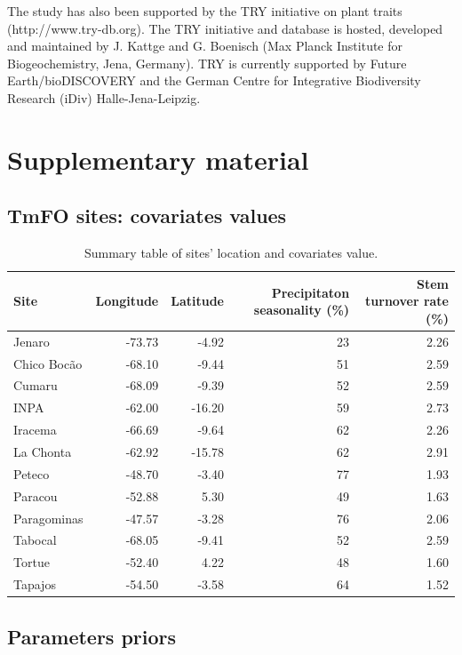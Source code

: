 \documentclass[]{elsarticle} %
\begin{document}
The study has also been supported by the TRY initiative on plant traits
(http://www.try-db.org). The TRY initiative and database is hosted,
developed and maintained by J. Kattge and G. Boenisch (Max Planck
Institute for Biogeochemistry, Jena, Germany). TRY is currently
supported by Future Earth/bioDISCOVERY and the German Centre for
Integrative Biodiversity Research (iDiv) Halle-Jena-Leipzig.

\section{Supplementary material}\label{supplementary-material}

\subsection{TmFO sites: covariates
values}\label{tmfo-sites-covariates-values}

\begin{table}

\caption{\label{tab:unnamed-chunk-3}\label{tab:sites}Summary table of sites' location and covariates value.}
\centering
\begin{tabular}[t]{lrrrr}
\toprule
Site & Longitude & Latitude & Precipitaton seasonality (\%) & Stem turnover rate (\%)\\
\midrule
Jenaro & -73.73 & -4.92 & 23 & 2.26\\
Chico Bocão & -68.10 & -9.44 & 51 & 2.59\\
Cumaru & -68.09 & -9.39 & 52 & 2.59\\
INPA & -62.00 & -16.20 & 59 & 2.73\\
Iracema & -66.69 & -9.64 & 62 & 2.26\\
\addlinespace
La Chonta & -62.92 & -15.78 & 62 & 2.91\\
Peteco & -48.70 & -3.40 & 77 & 1.93\\
Paracou & -52.88 & 5.30 & 49 & 1.63\\
Paragominas & -47.57 & -3.28 & 76 & 2.06\\
Tabocal & -68.05 & -9.41 & 52 & 2.59\\
\addlinespace
Tortue & -52.40 & 4.22 & 48 & 1.60\\
Tapajos & -54.50 & -3.58 & 64 & 1.52\\
\bottomrule
\end{tabular}
\end{table}

\subsection{Parameters priors}\label{parameters-priors}
\end{document}
